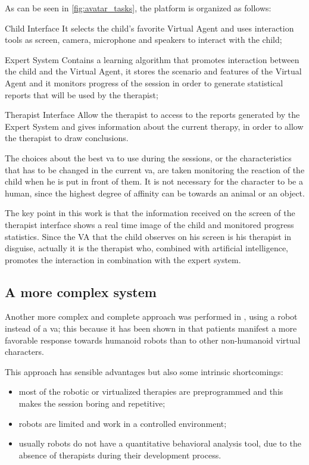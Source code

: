 \documentclass[12pt,journal,draftclsnofoot,onecolumn]{IEEEtran}
\begin{document}
As can be seen in \autoref{fig:avatar_tasks}, the platform is organized as follows:
\begin{LaTeXdescription}
	\item[Child Interface] It selects the child's favorite Virtual Agent and uses interaction tools as screen, camera, microphone and speakers to interact with the child;
	\item[Expert System] Contains a learning algorithm that promotes interaction between the child and the Virtual Agent, it stores the scenario and features of the Virtual Agent and it monitors progress of the session in order to generate statistical reports that will be used by the therapist;
	\item[Therapist Interface] Allow the therapist to access to the reports generated by the Expert System and gives information about the current therapy, in order to allow the therapist to draw conclusions.
\end{LaTeXdescription}

The choices about the best \gls{va} to use during the sessions, or the characteristics that has to be changed in the current \gls{va}, are taken monitoring the reaction of the child when he is put in front of them.
It is not necessary for the character to be a human, since the highest degree of affinity can be towards an animal or an object.

The key point in this work is that the information received on the screen of the therapist interface shows a real time image of the child and monitored progress statistics.
Since the VA that the child observes on his screen is his therapist in disguise, actually it is the therapist who, combined with artificial intelligence, promotes the interaction in combination with the expert system.

\subsection{A more complex system}
\label{sec:avatar_complex}

Another more complex and complete approach was performed in \cite{Alahbabi17}, using a robot instead of a \gls{va}; this because it has been shown in \cite{Pioggia08} that patients manifest a more favorable response towards humanoid robots than to other non-humanoid virtual characters.

This approach has sensible advantages but also some intrinsic shortcomings:
\begin{itemize}
	\item most of the robotic or virtualized therapies are preprogrammed and this makes the session boring and repetitive;
	\item robots are limited and work in a controlled environment;
	\item usually robots do not have a quantitative behavioral analysis tool, due to the absence of therapists during their development process.
\end{itemize}
\end{document}

